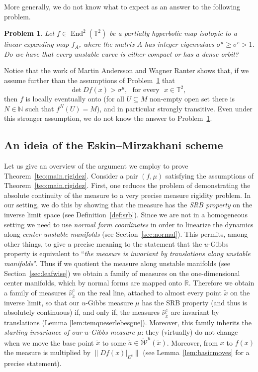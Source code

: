 \documentclass[a4paper,11pt,reqno]{amsart}
\def\det{\textrm{det}\ }
\newcommand{\R}{{\mathbb R}}
\newcommand{\N}{{\mathbb N}}
\newcommand{\TT}{{\mathbb{T}^2}}
\newcommand{\cW}{{\mathcal W}}
\newcommand{\tix}{\tilde{x}}
\newcommand{\ta}{\tilde{a}}
\newcommand{\w}{\widetilde{\cW}}
\newtheorem{problem}{Problem}
\theoremstyle{definition}
\begin{document}
More generally, we do not know what to expect as an answer to the following problem.

\begin{problem}
\label{prob:redutivel}
Let $f\in\operatorname{End}^2(\TT)$ be a partially hyperbolic map isotopic to a linear expanding map $f_A$, where the matrix $A$ has integer eigenvalues $\sigma^u\geq\sigma^c>1$. Do we have that every unstable curve is either compact or has a dense orbit?
\end{problem}

Notice that the work of Martin Andersson and Wagner Ranter \cite{AW} shows that, if we assume further than the assumptions of Problem~\ref{prob:redutivel} that 
\[
\det Df(x)>\sigma^u,\:\:\:\textrm{for every}\:\:\:x\in\TT,
\]
then $f$ is locally eventually onto (for all $U \subseteq M$ non-empty open set there is $N \in \N$ such that $f^N(U) = M$), and in particular strongly transitive. Even under this stronger assumption, we do not know the answer to Problem~\ref{prob:redutivel}.

\subsection{An ideia of the Eskin--Mirzakhani scheme}
Let us give an overview of the argument we employ to prove Theorem~\ref{teo:main.rigidez}. Consider a pair $(f,\mu)$ satisfying the assumptions of Theorem~\ref{teo:main.rigidez}. First, one reduces the problem of demonstrating the absolute continuity of the measure to a very precise measure rigidity problem. In our setting, we do this by showing that the measure has the \emph{SRB property} on the inverse limit space (see Definition~\ref{def:srb}). Since we are not in a homogeneous setting we need to use \emph{normal form coordinates} in order to linearize the dynamics along \emph{center unstable manifolds} (see Section~\ref{sec:normal}). This permits, among other things, to give a precise meaning to the statement that the $u$-Gibbs property is equivalent to ``\textit{the measure is invariant by translations along unstable manifolds}''. Thus if we quotient the measure along unstable manifolds (see Section~\ref{sec:leafwise}) we obtain a family of measures on the one-dimensional center manifolds, which by normal forms are mapped onto $\R$. Therefore we obtain a family of measures $\hat{\nu}^c_{\tix}$ on the real line, attached to almost every point $\tix$ on the inverse limit, so that our $u$-Gibbs measure $\mu$ has the SRB property (and thus is absolutely continuous) if, and only if, the measures $\hat{\nu}^c_{\tix}$ are invariant by translations (Lemma \ref{lem:temqueserlebesgue}).  Moreover, this family inherits the \emph{starting invariance of our $u$-Gibbs measure $\mu$}: they (virtually) do not change when we move the base point $\tix$ to some $\ta \in \w^u(\tix)$. Moreover, from $x$ to $f(x)$ the measure is multiplied by $\|Df(x)|_{E^c}\|$ (see Lemma~\ref{lem:basicmoves} for a precise statement).
\end{document}
